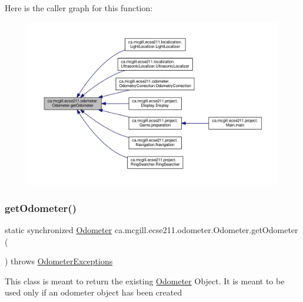 Here is the caller graph for this function\+:
\nopagebreak
\begin{figure}[H]
\begin{center}
\leavevmode
\includegraphics[width=350pt]{classca_1_1mcgill_1_1ecse211_1_1odometer_1_1_odometer_a99171f11e34dea918fa9dd069d721439_icgraph}
\end{center}
\end{figure}
\mbox{\label{classca_1_1mcgill_1_1ecse211_1_1odometer_1_1_odometer_a4e069b5a96cd43b29af0785244a99b51}} 
\subsubsection{\texorpdfstring{get\+Odometer()}{getOdometer()}\hspace{0.1cm}{\footnotesize\ttfamily [2/2]}}
{\footnotesize\ttfamily static synchronized \hyperlink{classca_1_1mcgill_1_1ecse211_1_1odometer_1_1_odometer}{Odometer} ca.\+mcgill.\+ecse211.\+odometer.\+Odometer.\+get\+Odometer (\begin{DoxyParamCaption}{ }\end{DoxyParamCaption}) throws \hyperlink{classca_1_1mcgill_1_1ecse211_1_1odometer_1_1_odometer_exceptions}{Odometer\+Exceptions}\hspace{0.3cm}{\ttfamily [static]}}

This class is meant to return the existing \hyperlink{classca_1_1mcgill_1_1ecse211_1_1odometer_1_1_odometer}{Odometer} Object. It is meant to be used only if an odometer object has been created

